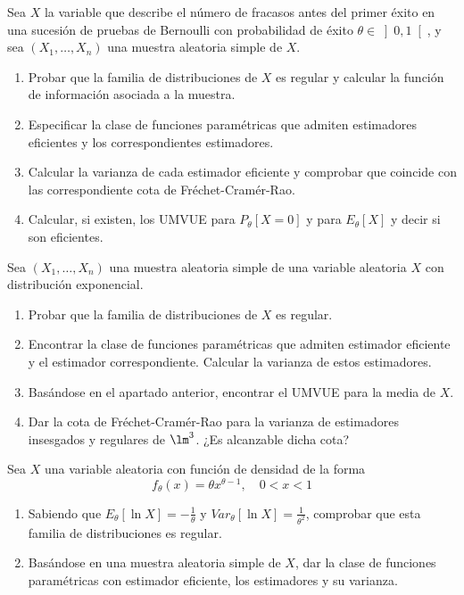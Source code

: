 \begin{ejercicio}
    Sea $X$ la variable que describe el número de fracasos antes del primer éxito en una sucesión de pruebas de Bernoulli con probabilidad de éxito $\theta\in \left]0,1\right[$, y sea $(X_1, \ldots, X_n)$ una muestra aleatoria simple de $X$.
    \begin{enumerate}[label=\alph*)]
        \item Probar que la familia de distribuciones de $X$ es regular y calcular la función de información asociada a la muestra.
        \item Especificar la clase de funciones paramétricas que admiten estimadores eficientes y los correspondientes estimadores.
        \item Calcular la varianza de cada estimador eficiente y comprobar que coincide con las correspondiente cota de Fréchet-Cramér-Rao.
        \item Calcular, si existen, los UMVUE para $P_\theta[X=0]$ y para $E_\theta[X]$ y decir si son eficientes.
    \end{enumerate}
\end{ejercicio}

\begin{ejercicio}
    Sea $(X_1, \ldots, X_n)$ una muestra aleatoria simple de una variable aleatoria $X$ con distribución exponencial.
    \begin{enumerate}[label=\alph*)]
        \item Probar que la familia de distribuciones de $X$ es regular.
        \item Encontrar la clase de funciones paramétricas que admiten estimador eficiente y el estimador correspondiente. Calcular la varianza de estos estimadores.
        \item Basándose en el apartado anterior, encontrar el UMVUE para la media de $X$.
        \item Dar la cota de Fréchet-Cramér-Rao para la varianza de estimadores insesgados y regulares de $\lm^3$. ¿Es alcanzable dicha cota?
    \end{enumerate}
\end{ejercicio}

\begin{ejercicio}
    Sea $X$ una variable aleatoria con función de densidad de la forma
    \begin{equation*}
        f_\theta(x) = \theta x^{\theta-1}, \quad 0<x<1
    \end{equation*}
    \begin{enumerate}[label=\alph*)]
        \item Sabiendo que $E_\theta[\ln X] = -\frac{1}{\theta}$ y $Var_\theta[\ln X] = \frac{1}{\theta^2}$, comprobar que esta familia de distribuciones es regular.
        \item Basándose en una muestra aleatoria simple de $X$, dar la clase de funciones paramétricas con estimador eficiente, los estimadores y su varianza.
    \end{enumerate}
\end{ejercicio}

